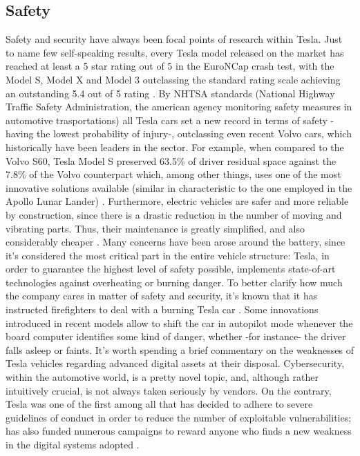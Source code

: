 \subsection{Safety}

Safety and security have always been focal points of research within Tesla. Just to name few self-speaking results, every Tesla model released on the market has reached at least a 5 star rating out of 5 in the EuroNCap crash test, with the Model S, Model X and Model 3 outclassing the standard rating scale achieving an outstanding 5.4 out of 5 rating \cite{model_s_rating}.
By NHTSA standards (National Highway Traffic Safety Administration, the american agency monitoring safety measures in automotive trasportations) all Tesla cars set a new record in terms of safety -having the lowest probability of injury-, outclassing even recent Volvo cars, which historically have been leaders in the sector. For example, when compared to the Volvo S60, Tesla Model S preserved 63.5\% of driver residual space against the 7.8\% of the Volvo counterpart which, among other things, uses one of the most innovative solutions available (similar in characteristic to the one employed in the Apollo Lunar Lander) \cite{model_s_rating}.
Furthermore, electric vehicles are safer and more reliable by construction, since there is a drastic reduction in the number of moving and vibrating parts. Thus, their maintenance is greatly simplified, and also considerably cheaper \cite{aboutTesla}. Many concerns have been arose around the battery, since it's considered the most critical part in the entire vehicle structure: Tesla, in order to guarantee the highest level of safety possible, implements state-of-art technologies against overheating or burning danger. To better clarify how much the company cares in matter of safety and security, it's known that it has instructed firefighters to deal with a burning Tesla car \cite{tesla_training_fire}. Some innovations introduced in recent models allow to shift the car in autopilot mode whenever the board computer identifies some kind of danger, whether -for instance- the driver falls asleep or faints.
It's worth spending a brief commentary on the weaknesses of Tesla vehicles regarding advanced digital assets at their disposal. Cybersecurity, within the automotive world, is a pretty novel topic, and, although rather intuitively crucial, is not always taken seriously by vendors. On the contrary, Tesla was one of the first among all that has decided to adhere to severe guidelines of conduct in order to reduce the number of exploitable vulnerabilities; has also funded numerous campaigns to reward anyone who finds a new weakness in the digital systems adopted \cite{tesla_security_methods}.

